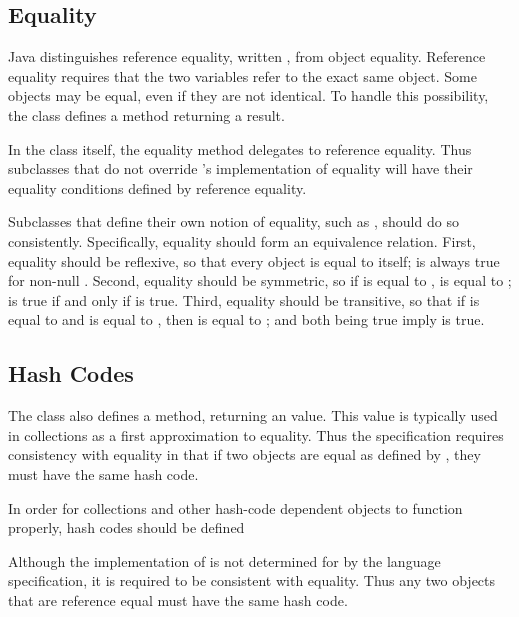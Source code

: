 \subsection{Equality}

Java distinguishes reference equality, written \code{==}, from object
equality.  Reference equality requires that the two variables refer to
the exact same object.  Some objects may be equal, even if they are
not identical.  To handle this possibility, the  class
defines a method  returning a 
result.  

In the  class itself, the equality method
delegates to reference equality.  Thus subclasses that do not override
's implementation of equality will have their equality
conditions defined by reference equality.

Subclasses that define their own notion of equality, such as
, should do so consistently.  Specifically, equality
should form an equivalence relation.  First, equality should
be reflexive, so that every object is equal to itself; 
 is always true for non-null .  Second,
equality should be symmetric, so if  is equal to ,
 is equal to ;  is true if
and only if  is true.  Third, equality should be
transitive, so that if  is equal to  and  is
equal to , then  is equal to ;
 and  both being true imply
 is true.

\subsection{Hash Codes}

The  class also defines a  method,
returning an  value.  This value is typically used in
collections as a first approximation to equality.  Thus the
specification requires consistency with equality in that if two
objects are equal as defined by , they must have the
same hash code.

In order for collections and other
hash-code dependent objects to function properly, hash codes should be
defined

Although the implementation of  is not determined for
 by the language specification, it is required to be 
consistent with equality.  Thus any two objects that are reference
equal must have the same hash code. 


